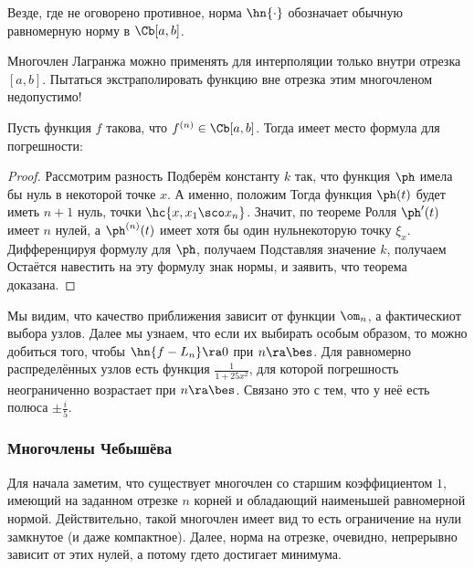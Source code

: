 \documentclass[a4paper]{article}
\begin{document}
Везде, где не оговорено противное, норма $\hn{\cdot}$ обозначает обычную равномерную норму в $\Cb[a,b]$.

\begin{note}
Многочлен Лагранжа можно применять для интерполяции только внутри отрезка $[a,b]$.
Пытаться экстраполировать функцию вне отрезка этим многочленом недопустимо!
\end{note}

\begin{theorem}\label{thm:LargangeErrorTheorem}
Пусть функция $f$ такова, что $f^{(n)}\in\Cb[a,b]$. Тогда имеет место формула для погрешности:
\end{theorem}
\begin{proof}
Рассмотрим разность
Подберём константу $k$ так, что функция $\ph$ имела бы нуль в некоторой точке $x$. А именно, положим
 Тогда функция $\ph(t)$ будет иметь $n+1$ нуль,  точки $\hc{x,x_1\sco x_n}$.
Значит, по теореме Ролля $\ph'(t)$ имеет $n$ нулей, а $\ph^{(n)}(t)$ имеет хотя бы один нуль\т некоторую точку $\xi_x$.
Дифференцируя формулу для $\ph$, получаем
Подставляя значение $k$, получаем
Остаётся навестить на эту формулу знак нормы, и заявить, что теорема доказана.
\end{proof}

\begin{note}
Мы видим, что качество приближения зависит от функции $\om_n$, а фактически\т от выбора узлов.
Далее мы узнаем, что если их выбирать особым образом, то можно добиться того, чтобы $\hn{f-L_n} \ra 0$
при $n\ra\bes$. Для равномерно распределённых узлов есть функция $\frac{1}{1+25x^2}$,
для которой погрешность неограниченно возрастает при $n\ra\bes$. Связано это с тем, что у неё есть полюса $\pm \frac{i}{5}$.
\end{note}

\subsubsection{Многочлены Чебышёва}

Для начала заметим, что существует многочлен со старшим коэффициентом $1$,
имеющий на заданном отрезке $n$ корней и обладающий наименьшей
равномерной нормой. Действительно, такой многочлен имеет вид
то есть ограничение на нули замкнутое (и даже компактное). Далее, норма на отрезке, очевидно,
непрерывно зависит от этих нулей, а потому где\д то достигает минимума.
\end{document}
